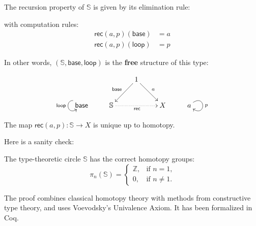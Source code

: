\documentclass[11pt]{article}
\newcommand{\myemph}[1]{\textbf{#1}}    %
\newcommand{\Sn}{\mathbb{S}}
\newcommand{\lloop}{\mathsf{loop}}
\newcommand{\base}{\mathsf{base}}
\newcommand{\id}[1]{\texttt{Id}_{#1}}
\begin{document}
The recursion property of $\Sn$ is given by its elimination rule:

\begin{prooftree}
\end{prooftree}
%


with computation rules:
\begin{align*}
\mathsf{rec}(a,p)(\base) &= a\\
\mathsf{rec}(a,p)(\lloop) &= p
\end{align*}



In other words, $(\mathbb{S}, \base, \lloop)$ is the \myemph{free} structure of this type:

$$
\xymatrix{ 
&& 1  \ar[dl]_{\base}  \ar[dr]^{a} && \\
\base \ar@(ul,dl)_{\lloop}  & \mathbb{S} \ar@{.>}[rr]_{\mathsf{rec}} && X & a\ar@(ur,dr)^{p} 
} 
$$
\medskip

The map $\mathsf{rec}(a,p) :  \mathbb{S} \rightarrow X$ is unique up to homotopy.


Here is a sanity check:

\medskip

\begin{theorem}[Shulman 2011] The type-theoretic circle $\Sn$ has the correct homotopy groups:
\[
\pi_n(\mathbb{S}) = \begin{cases}
	\mathbb{Z}, &\text{if $n = 1$,}\\
	0, &\text{if $n\neq 1$.}
	\end{cases}
\]
\end{theorem}
The proof combines classical homotopy theory with methods from constructive type theory, and uses Voevodsky's  Univalence Axiom.    It has been formalized in Coq.
\end{document}
